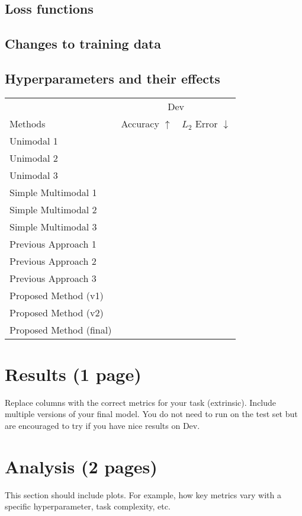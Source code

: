 \documentclass{article} %
\begin{document}
\subsection{Loss functions}

\subsection{Changes to training data}

\subsection{Hyperparameters and their effects}

\clearpage
\begin{table}[t]
\centering
\begin{tabular}{@{}lrr@{}}
\toprule
                            & \multicolumn{2}{c}{Dev} \\
Methods                     & Accuracy $\uparrow$ & $L_2$ Error $\downarrow$  \\
\midrule
Unimodal 1 \cite{} & & \\
Unimodal 2 \cite{} & & \\
Unimodal 3 \cite{} & & \\
\midrule
Simple Multimodal 1 \cite{} & & \\
Simple Multimodal 2 \cite{} & & \\
Simple Multimodal 3 \cite{} & & \\
\midrule
Previous Approach 1 \cite{} & & \\
Previous Approach 2 \cite{} & & \\
Previous Approach 3 \cite{} & & \\
\midrule
Proposed Method (v1)            & & \\
Proposed Method (v2)            & & \\
Proposed Method (final)            & & \\
\bottomrule
\end{tabular}
\end{table}
\section{ Results (1 page)}
Replace columns with the correct metrics for your task (extrinsic). Include multiple versions of your final model.  You do not need to run on the test set but are encouraged to try if you have nice results on Dev.

\clearpage
\section{ Analysis (2 pages)}
This section should include plots.  For example, how key metrics vary with a specific hyperparameter, task complexity, etc.
\end{document}
